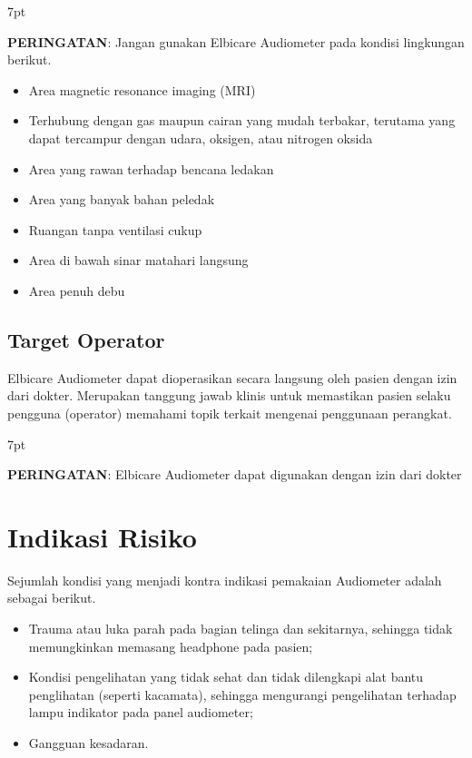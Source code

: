 \documentclass[11pt,a4paper,twoside,onecolumn]{book}
\newenvironment{formalred}{%
	\def\FrameCommand{%
		\hspace{1pt}%
		{\color{red}\vrule width 2pt}%
		{\color{formalshade}\vrule width 4pt}%
		\colorbox{formalshade}%
	}%
	\MakeFramed{\advance\hsize-\width\FrameRestore}%
	\noindent\hspace{-4.55pt}%
	\begin{adjustwidth}{}{7pt}%
		\vspace{2pt}\vspace{2pt}%
	}
	{%
		\vspace{2pt}\end{adjustwidth}\endMakeFramed%
}
\begin{document}
			\begin{formalred}
				\raisebox{0.125ex}{\resizebox{!}{2ex}{\danger}} \textbf{PERINGATAN}: 
				Jangan gunakan Elbicare Audiometer pada kondisi lingkungan berikut.
				\begin{itemize}
					\item Area magnetic resonance imaging (MRI)
					\item Terhubung dengan gas maupun cairan yang mudah terbakar, terutama yang dapat tercampur dengan udara, oksigen, atau nitrogen oksida
					\item Area yang rawan terhadap bencana ledakan
					\item Area yang banyak bahan peledak
					\item Ruangan tanpa ventilasi cukup
					\item Area di bawah sinar matahari langsung
					\item Area penuh debu
				\end{itemize}
				
			\end{formalred}
			
			\subsection{Target Operator}
			Elbicare Audiometer dapat dioperasikan secara langsung oleh pasien dengan izin dari dokter. Merupakan tanggung jawab klinis untuk memastikan pasien selaku pengguna (operator) memahami topik terkait mengenai penggunaan perangkat.
			\begin{formalred}
				\raisebox{0.125ex}{\resizebox{!}{2ex}{\danger}} \textbf{PERINGATAN}: 
				Elbicare Audiometer dapat digunakan dengan izin dari dokter
			\end{formalred}	
		
		\section{Indikasi Risiko}
		Sejumlah kondisi yang menjadi kontra indikasi pemakaian Audiometer adalah sebagai berikut.
		\begin{itemize}
			\item Trauma atau luka parah pada bagian telinga dan sekitarnya, sehingga tidak memungkinkan memasang headphone pada pasien;
			\item Kondisi pengelihatan yang tidak sehat dan tidak dilengkapi alat bantu penglihatan (seperti kacamata), sehingga mengurangi pengelihatan terhadap lampu indikator pada panel audiometer;
			\item Gangguan kesadaran.
		\end{itemize}
	
\end{document}
